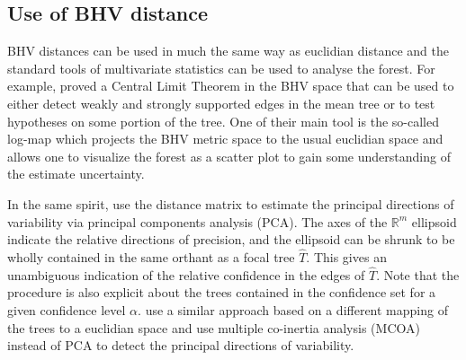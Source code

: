 \subsection{Use of BHV distance} \label{sec:means-and-variance}

BHV distances can be used in much the same way as euclidian distance and the standard tools of multivariate statistics can be used  to analyse the forest. For example, \citet{barden2014limiting} proved a Central Limit Theorem in the BHV space that can be used to either detect weakly and strongly supported edges in the mean tree or to test hypotheses on some portion of the tree. One of their main tool is the so-called log-map which projects the BHV metric space to the usual euclidian space and allows one to visualize the forest as a scatter plot to gain some understanding of the estimate uncertainty.



In the same spirit, \citet{willis2016confidence} use the distance matrix to
estimate  the  principal  directions  of  variability  via principal components analysis (PCA). The axes of the $\mathbb{R}^m$ ellipsoid indicate the relative directions of precision, and the ellipsoid can be shrunk  to be wholly contained in the same orthant as a focal tree $\hat{T}$. This gives an unambiguous indication of the relative confidence in the edges of $\hat{T}$. Note that the procedure is also explicit about the trees contained in the confidence set for a given confidence level $\alpha$. \citet{de2012phylo} use a similar approach based on a different mapping of the trees to a euclidian space and use multiple co-inertia analysis (MCOA) instead of PCA to detect the principal directions of variability.

